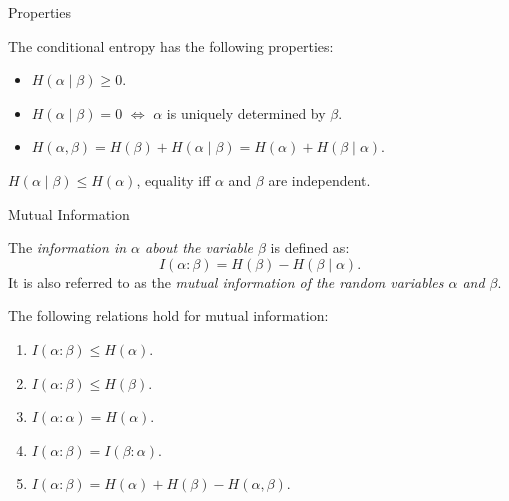 \documentclass[aspectratio=169]{beamer}
\begin{document}
\begin{frame}{Properties}
\begin{lemma}
    The conditional entropy has the following properties:
    \begin{itemize}
        \item \(H(\alpha\mid\beta) \ge 0\).
        \item \(H(\alpha\mid\beta) = 0\) \(\iff\) \(\alpha\) is uniquely determined by \(\beta\).
        \item \(H(\alpha,\beta) = H(\beta) + H(\alpha\mid\beta) = H(\alpha) + H(\beta\mid\alpha)\).
    \end{itemize}
\end{lemma}
\medskip\pause

\begin{corollary}
    \(H(\alpha \mid \beta) \le H(\alpha)\), equality iff $\alpha$ and $\beta$ are independent.
\end{corollary}

\end{frame}

\begin{frame}{Mutual Information}
\begin{definition}
    The \emph{information in \(\alpha\) about the variable \(\beta\)} is defined as:
    \[
    I(\alpha:\beta) = H(\beta) - H(\beta\mid\alpha).
    \]
    It is also referred to as the \emph{mutual information of the random variables \(\alpha\) and \(\beta\)}.
\end{definition}

\begin{lemma}
    The following relations hold for mutual information:
    \begin{enumerate}
        \item \(I(\alpha:\beta) \le H(\alpha)\).
        \item \(I(\alpha:\beta) \le H(\beta)\).
        \item \(I(\alpha:\alpha) = H(\alpha)\).
        \item \(I(\alpha:\beta) = I(\beta:\alpha)\).
        \item \(I(\alpha:\beta) = H(\alpha) + H(\beta) - H(\alpha,\beta)\).
    \end{enumerate}
\end{lemma}
\end{frame}
\end{document}

